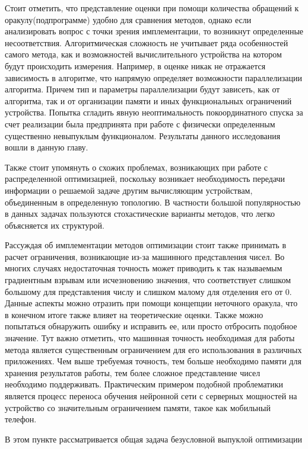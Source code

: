   Стоит отметить, что представление оценки при помощи количества обращений к оракулу(подпрограмме) удобно для сравнения методов, однако если анализировать вопрос с точки зрения имплементации, то возникнут определенные несоответствия. Алгоритмическая сложность не учитывает ряда особенностей самого метода, как и возможностей вычислительного устройства на котором будут происходить измерения. Например, в оценке никак не отражается зависимость  в алгоритме, что напрямую определяет возможности параллелизации алгоритма. Причем тип и параметры параллелизации будут зависеть, как от алгоритма, так и от организации памяти и иных функциональных ограничений устройства. Попытка сгладить явную неоптимальность покоординатного спуска за счет реализации была предпринята при работе с физически определенным существенно невыпуклым функционалом. Результаты данного исследования вошли в данную главу. 

  Также стоит упомянуть о схожих проблемах, возникающих при работе с распределенной оптимизацией, поскольку возникает необходимость передачи информации о решаемой задаче другим вычисляющим устройствам, объединенным в определенную топологию. В частности большой популярностью в данных задачах пользуются стохастические варианты методов, что легко объясняется их структурой. 

  Рассуждая об имплементации методов оптимизации стоит также принимать в расчет ограничения, возникающие из-за машинного представления чисел.  Во многих случаях недостаточная точность может приводить к так называемым градиентным взрывам или исчезновению значения, что соответствует слишком большому для представления числу и слишком малому для отделения его от 0. Данные аспекты можно отразить при помощи концепции неточного оракула, что в конечном итоге также влияет на теоретические оценки. Также можно попытаться обнаружить ошибку и исправить ее, или просто отбросить подобное значение. Тут важно отметить, что машинная точность необходимая для работы метода является существенным ограничением для его использования в различных приложениях. Чем выше требуемая точность, тем больше необходимо памяти для хранения результатов работы, тем более сложное представление чисел необходимо поддерживать. Практическим примером подобной проблематики является процесс переноса обучения нейронной сети с серверных мощностей на устройство со значительным ограничением памяти, такое как мобильный телефон. 


  В этом пункте рассматривается общая задача безусловной выпуклой оптимизации \cite{gasnikov2017universal}


